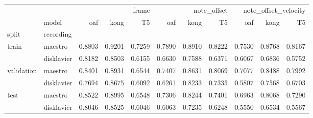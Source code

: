 \begin{tabular}{llrrrrrrrrr}
\toprule
 &  & \multicolumn{3}{r}{frame} & \multicolumn{3}{r}{note_offset} & \multicolumn{3}{r}{note_offset_velocity} \\
 & model & oaf & kong & T5 & oaf & kong & T5 & oaf & kong & T5 \\
split & recording &  &  &  &  &  &  &  &  &  \\
\midrule
\multirow[t]{2}{*}{train} & maestro & 0.8803 & 0.9201 & 0.7259 & 0.7890 & 0.8910 & 0.8222 & 0.7530 & 0.8768 & 0.8167 \\
 & disklavier & 0.8182 & 0.8503 & 0.6155 & 0.6630 & 0.7588 & 0.6371 & 0.6067 & 0.6836 & 0.5752 \\
\cline{1-11}
\multirow[t]{2}{*}{validation} & maestro & 0.8401 & 0.8931 & 0.6544 & 0.7407 & 0.8631 & 0.8069 & 0.7077 & 0.8488 & 0.7992 \\
 & disklavier & 0.7694 & 0.8675 & 0.6092 & 0.6261 & 0.8233 & 0.7335 & 0.5807 & 0.7568 & 0.6703 \\
\cline{1-11}
\multirow[t]{2}{*}{test} & maestro & 0.8522 & 0.8995 & 0.6548 & 0.7306 & 0.8244 & 0.7401 & 0.6963 & 0.8068 & 0.7290 \\
 & disklavier & 0.8046 & 0.8525 & 0.6046 & 0.6063 & 0.7235 & 0.6248 & 0.5550 & 0.6534 & 0.5567 \\
\cline{1-11}
\bottomrule
\end{tabular}
